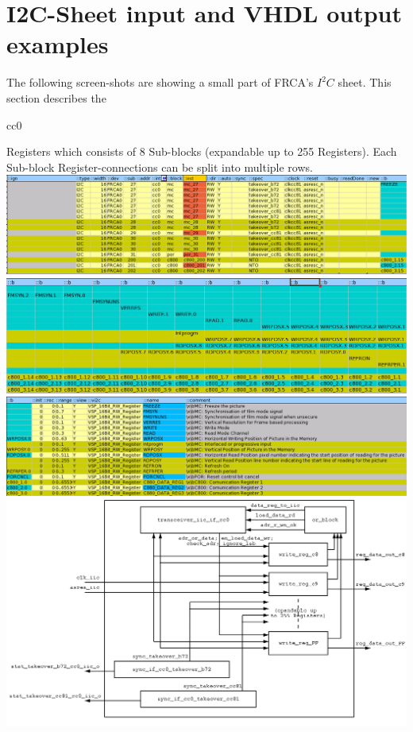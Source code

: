 \documentclass[a4paper,12pt]{report}
\begin{document}
\section{I2C-Sheet input and VHDL output examples}
The following screen-shots are showing a small part of  FRCA's \begin{math}I^2C\end{math} sheet. This section describes the \begin{tt}cc0\end{tt} Registers which consists of 8 Sub-blocks (expandable up to 255 Registers). Each Sub-block Register-connections can be split into multiple rows.\newline
\newline
\includegraphics[scale=0.43]{images/FRCA_iic_part0.png}\newline
\newline
\includegraphics[scale=0.45]{images/FRCA_iic_part1.png}\newline
\newline
\includegraphics[scale=0.43]{images/FRCA_iic_part2.png}\newline
\newline
\includegraphics[scale=0.4]{images/serial_iic_reg.png}\newline
\end{document}
